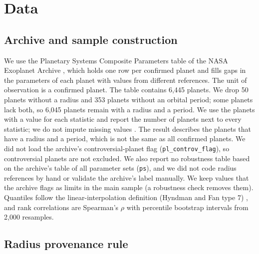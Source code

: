 \documentclass[11pt]{article}
\begin{document}
\section{Data}

\subsection{Archive and sample construction}

We use the Planetary Systems Composite Parameters table of the NASA Exoplanet Archive \cite{NEA_PSCompPars,Christiansen2025_NEA}, which holds one row per confirmed planet and fills gaps in the parameters of each planet with values from different references. The unit of observation is a confirmed planet. The table contains 6,445 planets. We drop 50 planets without a radius and 353 planets without an orbital period; some planets lack both, so 6,045 planets remain with a radius and a period.
We use the planets with a value for each statistic and report the number of planets next to every statistic; we do not impute missing values \cite{little2019statistical}. The result describes the planets that have a radius and a period, which is not the same as all confirmed planets. We did not load the archive's controversial-planet flag (\texttt{pl\_controv\_flag}), so controversial planets are not excluded. We also report no robustness table based on the archive's table of all parameter sets (\texttt{ps}), and we did not code radius references by hand or validate the archive's label manually. We keep values that the archive flags as limits in the main sample (a robustness check removes them). Quantiles follow the linear-interpolation definition (Hyndman and Fan type 7) \cite{hyndman1996sample}, and rank correlations are Spearman's $\rho$ \cite{spearman1904proof} with percentile bootstrap intervals from 2,000 resamples.

\subsection{Radius provenance rule}
\end{document}
